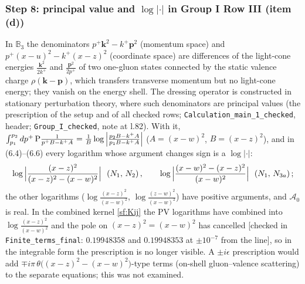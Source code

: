 \documentclass[10pt]{article}
\def\mf#1{\mathbb{#1}}
\begin{document}
\subsubsection{Step 8: principal value and $\log|\cdot|$ in Group I Row III (item (d))}
\noindent In $\mf{B}_{3}$ the denominators $p^{+}\mathbf{k}^{2}-k^{+}\mathbf{p}^{2}$ (momentum space) and $p^{+}(x-u)^{2}-k^{+}(x-z)^{2}$ (coordinate space) are differences of the light-cone energies $\frac{\mathbf{k}^{2}}{2k^{+}}$ and $\frac{\mathbf{p}^{2}}{2p^{+}}$ of two one-gluon states connected by the static valence charge $\rho(\mathbf{k}-\mathbf{p})$, which transfers transverse momentum but no light-cone energy; they vanish on the energy shell. The dressing operator is constructed in stationary perturbation theory, where such denominators are principal values (the prescription of the setup and of all checked rows; \texttt{Calculation\_main\_1\_checked}, header; \texttt{Group\_I\_checked}, note at l.82). With it, $\int_{p_{1}}^{p_{2}}dp^{+}\,{\rm P}\frac{1}{p^{+}B-k^{+}A}=\frac1B\log\Big|\frac{p_{2}B-k^{+}A}{p_{1}B-k^{+}A}\Big|$ ($A=(x-w)^{2}$, $B=(x-z)^{2}$), and in (6.4)--(6.6) every logarithm whose argument changes sign is a $\log|\cdot|$:
\begin{align}
\log\Big|\frac{(x-z)^{2}}{(x-z)^{2}-(x-w)^{2}}\Big|\ \ (N_{1},\,N_{2})\,,\qquad \log\Big|\frac{(x-w)^{2}-(x-z)^{2}}{(x-w)^{2}}\Big|\ \ (N_{1},\,N_{3a})\,;\notag
\end{align}
the other logarithms ($\log\frac{(x-z)^{2}}{(x-w)^{2}}$, $\log\frac{(z-w)^{2}}{(x-w)^{2}}$) have positive arguments, and $\mathcal{A}_{0}$ is real. In the combined kernel \eqref{sf:Kij} the PV logarithms have combined into $\log\frac{(x-z)^{2}}{(x-w)^{2}}$ and the pole on $(x-z)^{2}=(x-w)^{2}$ has cancelled [checked in \texttt{Finite\_terms\_final}: $0.19948358$ and $0.19948353$ at $\pm10^{-7}$ from the line], so in the integrable form the prescription is no longer visible. A $\pm i\epsilon$ prescription would add $\mp i\pi\,\theta\big((x-z)^{2}-(x-w)^{2}\big)$-type terms (on-shell gluon--valence scattering) to the separate equations; this was not examined.
\end{document}
